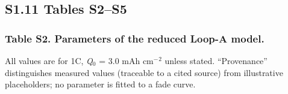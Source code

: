 \documentclass[11pt,a4paper]{article}
\renewcommand{\arraystretch}{1.15}
\begin{document}
\subsection*{S1.11 Tables S2--S5}


\subsubsection*{Table S2. Parameters of the reduced Loop-A model.}


All values are for 1C, \emph{Q}\ensuremath{_{0}} = 3.0 mAh cm\ensuremath{^{-}}\ensuremath{^{2}} unless stated. \textquotedblleft{}Provenance\textquotedblright{} distinguishes measured values (traceable to a cited source) from illustrative placeholders; no parameter is fitted to a fade curve.


\begingroup\footnotesize
\setlength{\tabcolsep}{3pt}
\renewcommand{\arraystretch}{1.12}
\sloppy
\end{document}
